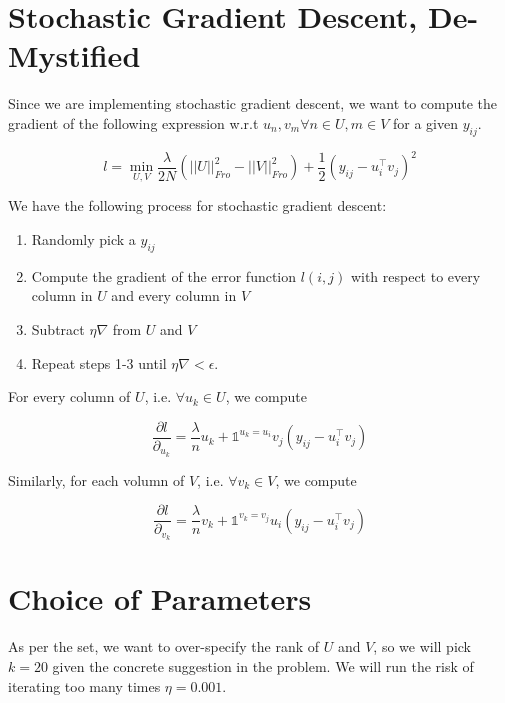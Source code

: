 \documentclass{article}
\begin{document}
\section*{Stochastic Gradient Descent, De-Mystified}

Since we are implementing stochastic gradient descent, we want to
compute the gradient of the following expression w.r.t $u_{n}, v_{m} \forall n \in U, m \in V$ for
a given $y_{ij}$.

$$ l =  \min_{U, V} \frac{\lambda}{2N} (||U||^{2}_{Fro} - ||V||^{2}_{Fro}) + \frac{1}{2} (y_{ij} - u_{i}^{\intercal}v_{j})^{2} $$

We have the following process for stochastic gradient descent:

\begin{enumerate}
    \item Randomly pick a $y_{ij}$
    \item Compute the gradient of the error function $l(i,j)$ with respect to every column
        in $U$ and every column in $V$
    \item Subtract $\eta \nabla$ from $U$ and $V$
    \item Repeat steps 1-3 until $\eta \nabla < \epsilon$.
\end{enumerate}

\noindent For every column of $U$, i.e. $\forall u_{k} \in U$, we compute

$$ \frac{\partial l}{\partial_{u_{k}}} = \frac{\lambda}{n} u_{k} + \mathds{1}^{u_{k} = u_{i}} v_{j}(y_{ij} - u_{i}^{\intercal}v_{j}) $$

\noindent Similarly, for each volumn of $V$, i.e. $\forall v_{k} \in V$, we compute

$$ \frac{\partial l}{\partial_{v_{k}}} = \frac{\lambda}{n} v_{k} + \mathds{1}^{v_{k} = v_{j}} u_{i}(y_{ij} - u_{i}^{\intercal}v_{j}) $$

\section*{Choice of Parameters}
As per the set, we want to over-specify the rank of $U$ and $V$, so we will pick $k = 20$
given the concrete suggestion in the problem. We will run the risk of iterating too
many times $\eta = 0.001$.
\end{document}
